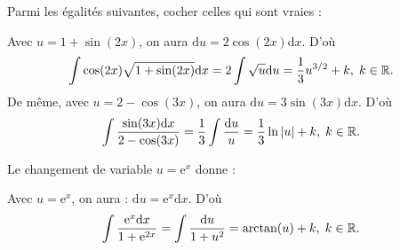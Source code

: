 \begin{question}
Parmi les égalités suivantes, cocher celles qui sont vraies :
\begin{answers}  
\end{answers}
\begin{explanations}
Avec $u=1+\sin (2x)$, on aura $\displaystyle \mathrm{d}u=2\cos (2x)\mathrm{d}x$. D'où
$$\int \cos (2x)\sqrt{1+\sin (2x)}\mathrm{d}x=2\int \sqrt{u}\mathrm{d}u=\frac{1}{3}u^{3/2}+k,\; k\in \mathbb{R}.$$
De même, avec $u=2-\cos (3x)$, on aura $\displaystyle \mathrm{d}u=3\sin(3x)\mathrm{d}x$. D'où
$$\int \frac{\sin (3x)\mathrm{d}x}{2-\cos (3x)}=\frac{1}{3}\int \frac{\mathrm{d}u}{u}=\frac{1}{3}\ln |u|+k,\; k\in \mathbb{R}.$$
\end{explanations}
\end{question}

\begin{question}
Le changement de variable $u=\mathrm{e}^x$ donne :
\begin{answers}  
\end{answers}
\vskip2mm
\begin{explanations}
Avec $u=\mathrm{e}^x$, on aura : $\mathrm{d}u=\mathrm{e}^x\mathrm{d}x$. D'où
$$\displaystyle \int \frac{\mathrm{e}^x\mathrm{d}x}{1+\mathrm{e}^{2x}}=\int \frac{\mathrm{d}u}{1+u^2}=\arctan(u)+k,\; k\in \mathbb{R}.$$
\end{explanations}
\end{question}

